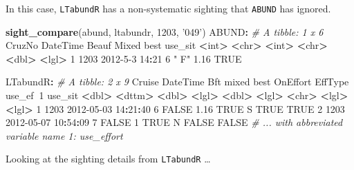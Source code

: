 \documentclass[
]{book}
\newenvironment{Shaded}{\begin{snugshade}}{\end{snugshade}}
\newcommand{\CommentTok}[1]{\textcolor[rgb]{0.56,0.35,0.01}{\textit{#1}}}
\newcommand{\DecValTok}[1]{\textcolor[rgb]{0.00,0.00,0.81}{#1}}
\newcommand{\ErrorTok}[1]{\textcolor[rgb]{0.64,0.00,0.00}{\textbf{#1}}}
\newcommand{\FloatTok}[1]{\textcolor[rgb]{0.00,0.00,0.81}{#1}}
\newcommand{\KeywordTok}[1]{\textcolor[rgb]{0.13,0.29,0.53}{\textbf{#1}}}
\newcommand{\NormalTok}[1]{#1}
\newcommand{\OperatorTok}[1]{\textcolor[rgb]{0.81,0.36,0.00}{\textbf{#1}}}
\newcommand{\OtherTok}[1]{\textcolor[rgb]{0.56,0.35,0.01}{#1}}
\newcommand{\StringTok}[1]{\textcolor[rgb]{0.31,0.60,0.02}{#1}}
\begin{document}
In this case, \texttt{LTabundR} has a non-systematic sighting that \texttt{ABUND} has ignored.

\begin{Shaded}
\begin{Highlighting}[]
\KeywordTok{sight_compare}\NormalTok{(abund, ltabundr, }\DecValTok{1203}\NormalTok{, }\StringTok{'049'}\NormalTok{)}
\NormalTok{ABUND}\OperatorTok{:}
\CommentTok{# A tibble: 1 x 6}
\StringTok{  }\NormalTok{CruzNo DateTime       Beauf Mixed  best use_sit}
   \OperatorTok{<}\NormalTok{int}\OperatorTok{>}\StringTok{ }\ErrorTok{<}\NormalTok{chr}\OperatorTok{>}\StringTok{          }\ErrorTok{<}\NormalTok{int}\OperatorTok{>}\StringTok{ }\ErrorTok{<}\NormalTok{chr}\OperatorTok{>}\StringTok{ }\ErrorTok{<}\NormalTok{dbl}\OperatorTok{>}\StringTok{ }\ErrorTok{<}\NormalTok{lgl}\OperatorTok{>}\StringTok{  }
\DecValTok{1}   \DecValTok{1203} \DecValTok{2012-5-3} \DecValTok{14}\OperatorTok{:}\DecValTok{21}     \DecValTok{6} \StringTok{" F"}   \FloatTok{1.16} \OtherTok{TRUE}   

\NormalTok{LTabundR}\OperatorTok{:}
\CommentTok{# A tibble: 2 x 9}
\StringTok{  }\NormalTok{Cruise DateTime              Bft mixed  best OnEffort EffType use_ef}\OperatorTok{~}\DecValTok{1}\NormalTok{ use_sit}
   \OperatorTok{<}\NormalTok{dbl}\OperatorTok{>}\StringTok{ }\ErrorTok{<}\NormalTok{dttm}\OperatorTok{>}\StringTok{              }\ErrorTok{<}\NormalTok{dbl}\OperatorTok{>}\StringTok{ }\ErrorTok{<}\NormalTok{lgl}\OperatorTok{>}\StringTok{ }\ErrorTok{<}\NormalTok{dbl}\OperatorTok{>}\StringTok{ }\ErrorTok{<}\NormalTok{lgl}\OperatorTok{>}\StringTok{    }\ErrorTok{<}\NormalTok{chr}\OperatorTok{>}\StringTok{   }\ErrorTok{<}\NormalTok{lgl}\OperatorTok{>}\StringTok{    }\ErrorTok{<}\NormalTok{lgl}\OperatorTok{>}\StringTok{  }
\DecValTok{1}   \DecValTok{1203} \DecValTok{2012-05-03} \DecValTok{14}\OperatorTok{:}\DecValTok{21}\OperatorTok{:}\DecValTok{40}     \DecValTok{6} \OtherTok{FALSE}  \FloatTok{1.16} \OtherTok{TRUE}\NormalTok{     S       }\OtherTok{TRUE}     \OtherTok{TRUE}   
\DecValTok{2}   \DecValTok{1203} \DecValTok{2012-05-07} \DecValTok{10}\OperatorTok{:}\DecValTok{54}\OperatorTok{:}\DecValTok{09}     \DecValTok{7} \OtherTok{FALSE}  \DecValTok{1}    \OtherTok{TRUE}\NormalTok{     N       }\OtherTok{FALSE}    \OtherTok{FALSE}  
\CommentTok{# ... with abbreviated variable name 1: use_effort}
\end{Highlighting}
\end{Shaded}

Looking at the sighting details from \texttt{LTabundR} \ldots{}
\end{document}
